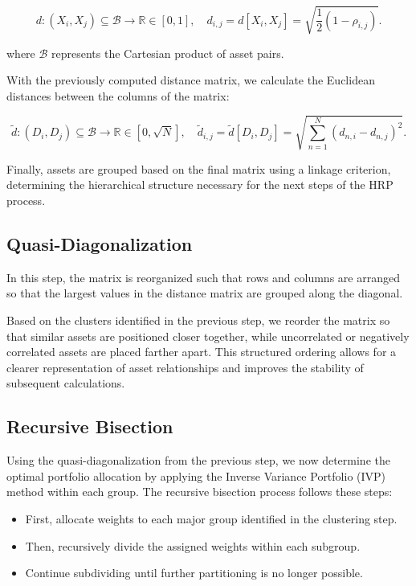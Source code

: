 \documentclass[english]{maciarticle}
\begin{document}
\[
d : (X_i, X_j) \subseteq \mathcal{B} \to \mathbb{R} \in [0, 1], \quad d_{i,j} = d[X_i, X_j] = \sqrt{\frac{1}{2}(1 - \rho_{i,j})}.
\]

where \(\mathcal{B}\) represents the Cartesian product of asset pairs.

With the previously computed distance matrix, we calculate the Euclidean distances between the columns of the matrix:

\[
\tilde{d} : (D_i, D_j) \subseteq \mathcal{B} \to \mathbb{R} \in [0, \sqrt{N}], \quad \tilde{d}_{i,j} = \tilde{d}[D_i, D_j] = \sqrt{\sum_{n=1}^N (d_{n,i} - d_{n,j})^2}.
\]

Finally, assets are grouped based on the final matrix using a linkage criterion, determining the hierarchical structure necessary for the next steps of the HRP process.

\subsection{Quasi-Diagonalization}
In this step, the matrix is reorganized such that rows and columns are arranged so that the largest values in the distance matrix are grouped along the diagonal.

Based on the clusters identified in the previous step, we reorder the matrix so that similar assets are positioned closer together, while uncorrelated or negatively correlated assets are placed farther apart. This structured ordering allows for a clearer representation of asset relationships and improves the stability of subsequent calculations.

\subsection{Recursive Bisection}
Using the quasi-diagonalization from the previous step, we now determine the optimal portfolio allocation by applying the Inverse Variance Portfolio (IVP) method within each group. The recursive bisection process follows these steps:

\begin{itemize}
    \item First, allocate weights to each major group identified in the clustering step.
    \item Then, recursively divide the assigned weights within each subgroup.
    \item Continue subdividing until further partitioning is no longer possible.
\end{itemize}
\end{document}
